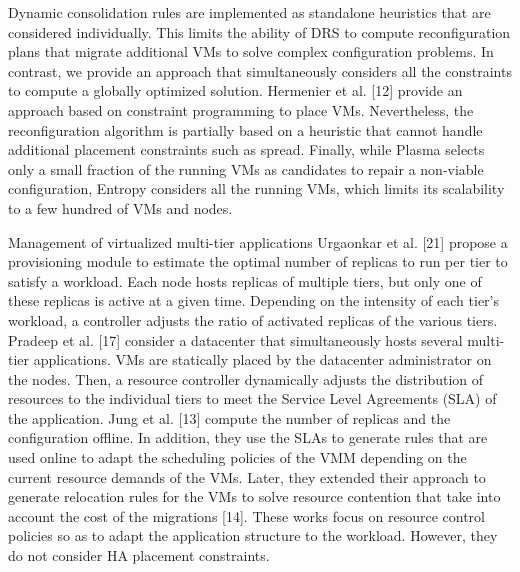 \begin{frame}[allowframebreaks]{Dynamic consolidation}
rules are implemented as standalone heuristics that are considered individually.
This limits the ability of DRS to compute reconfiguration plans that migrate
additional VMs to solve complex configuration problems. In contrast, we provide 
an approach that simultaneously considers all the constraints to compute a
globally optimized solution. Hermenier et al. [12] provide an approach based on
constraint programming to place VMs. Nevertheless, the reconfiguration algorithm
 is partially based on a heuristic that cannot handle additional placement
constraints such as spread. Finally, while Plasma selects only a small fraction
of the running VMs as candidates to repair a non-viable configuration, Entropy
considers all the running VMs, which limits its scalability to a few hundred of
VMs and nodes.

\end{frame}
\begin{frame}[allowframebreaks]{Management of virtualized multi-tier applications}
Urgaonkar et al. [21]
propose a provisioning module to estimate the optimal number of replicas to
run per tier to satisfy a workload. Each node hosts replicas of multiple tiers, but
only one of these replicas is active at a given time. Depending on the intensity
of each tier’s workload, a controller adjusts the ratio of activated replicas of the
various tiers. Pradeep et al. [17] consider a datacenter that simultaneously hosts
several multi-tier applications. VMs are statically placed by the datacenter
administrator on the nodes. Then, a resource controller dynamically adjusts
the distribution of resources to the individual tiers to meet the Service Level
Agreements (SLA) of the application.
\br
Jung et al. [13] compute the number of replicas and the configuration offline.
In addition, they use the SLAs to generate rules that are used online to adapt
the scheduling policies of the VMM depending on the current resource demands
of the VMs. Later, they extended their approach to generate relocation rules
for the VMs to solve resource contention that take into account the cost of the
migrations [14].
\br
These works focus on resource control policies so as to adapt the application 
structure to the workload. However, they do not consider HA placement
constraints.

\end{frame}
